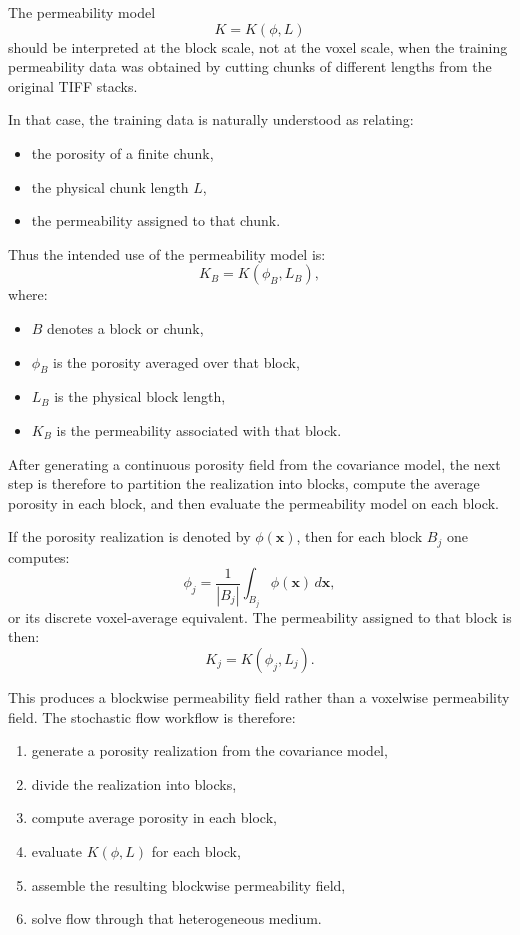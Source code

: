 \documentclass[11pt]{article}
\begin{document}
The permeability model
\[
K = K(\phi,L)
\]
should be interpreted at the block scale, not at the voxel scale, when the
training permeability data was obtained by cutting chunks of different lengths
from the original TIFF stacks.

In that case, the training data is naturally understood as relating:
\begin{itemize}
\item the porosity of a finite chunk,
\item the physical chunk length \(L\),
\item the permeability assigned to that chunk.
\end{itemize}

Thus the intended use of the permeability model is:
\[
K_B = K(\phi_B, L_B),
\]
where:
\begin{itemize}
\item \(B\) denotes a block or chunk,
\item \(\phi_B\) is the porosity averaged over that block,
\item \(L_B\) is the physical block length,
\item \(K_B\) is the permeability associated with that block.
\end{itemize}

After generating a continuous porosity field from the covariance model, the next
step is therefore to partition the realization into blocks, compute the average
porosity in each block, and then evaluate the permeability model on each block.

If the porosity realization is denoted by \(\phi(\bm{x})\), then for each block
\(B_j\) one computes:
\[
\phi_j
=
\frac{1}{|B_j|}
\int_{B_j}\phi(\bm{x})\,d\bm{x},
\]
or its discrete voxel-average equivalent. The permeability assigned to that block
is then:
\[
K_j = K(\phi_j, L_j).
\]

This produces a blockwise permeability field rather than a voxelwise
permeability field. The stochastic flow workflow is therefore:
\begin{enumerate}[label=\arabic*.]
\item generate a porosity realization from the covariance model,
\item divide the realization into blocks,
\item compute average porosity in each block,
\item evaluate \(K(\phi,L)\) for each block,
\item assemble the resulting blockwise permeability field,
\item solve flow through that heterogeneous medium.
\end{enumerate}
\end{document}
